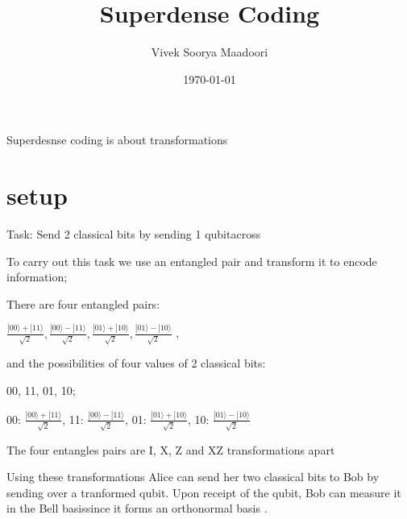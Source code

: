 \documentclass{article}
\newcommand{\0}{{$|0\rangle$}}
\newcommand{\1}{{$|1\rangle$}}
\newcommand{\bellstates}{{$\frac{|00\rangle + |11\rangle}{\sqrt{2}}, 
\frac{|00\rangle - |11\rangle}{\sqrt{2}}, 
\frac{|01\rangle + |10\rangle}{\sqrt{2}},
\frac{|01\rangle - |10\rangle}{\sqrt{2}}$
}}
\begin{document}
\title{Superdense Coding}
\author{Vivek Soorya Maadoori}
\date{\today}
\maketitle

Superdesnse coding is about transformations

\section{setup}
Task: Send 2 classical bits by sending 1 qubit\footnotemark[1] across

To carry out this task we use an entangled pair and transform it to encode information;

There are four entangled pairs:

\bellstates,

and the possibilities of four values of 2 classical bits:

00, 11, 01, 10;

00: $\frac{|00\rangle + |11\rangle}{\sqrt{2}}$,
11: $\frac{|00\rangle - |11\rangle}{\sqrt{2}}$,
01: $\frac{|01\rangle + |10\rangle}{\sqrt{2}}$,
10: $\frac{|01\rangle - |10\rangle}{\sqrt{2}}$

The four entangles pairs are I, X, Z and XZ transformations apart \footnotemark[2] \footnotemark[3]



Using these transformations Alice can send her two classical bits to Bob by sending over a tranformed qubit. Upon receipt of the qubit, Bob can measure it in the Bell basis\footnotemark[4] since it forms an orthonormal basis \footnotemark[5].

\end{document}
